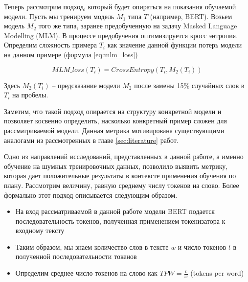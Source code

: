 \documentclass{spbau-diploma}
\begin{document}
Теперь рассмотрим подход, который будет опираться на показания обучаемой модели. Пусть мы тренируем модель $M_1$ типа $T$ (например, BERT). Возьем модель $M_2$ того же типа, заранее предобученную на задачу Masked Language Modelling (MLM). В процессе предобучения оптимизируется кросс энтропия. Определим сложность примера $T_i$ как значение данной функции потерь модели на данном примере (формула \ref{eq:mlm_loss})

\begin{equation} \label{eq:mlm_loss}
MLM\_loss(T_i) = CrossEntropy(T_i, M_2(T_i))
\end{equation}

Здесь $M_2(T_i)$ -- предсказание модели $M_2$ после замены 15\% случайных слов в $T_i$ на пробелы.

Заметим, что такой подход опирается на структуру конкретной модели и позволяет косвенно определить, насколько конкретный пример сложен для рассматриваемой модели. Данная метрика мотивирована существующими аналогами из рассмотренных в главе \ref{sec:literature} работ.

Одно из направлений исследований, представленных в данной работе, а именно обучение на шумных тренировочных данных, позволило выявить метрику, которая дает положительные результаты в контексте применения обучения по плану. Рассмотрим величину, равную среднему числу токенов на слово. Более формально этот подход описывается следующим образом.

\begin{itemize}
	\item На вход рассматриваемой в данной работе модели BERT подается последовательность токенов, полученная применением токенизатора к входному тексту
	\item Таким образом, мы знаем количество слов в тексте $w$ и число токенов $t$ в полученной последовательности токенов
	\item Определим среднее число токенов на слово как $TPW=\frac{t}{w}$ (tokens per word)
\end{itemize}
\end{document}
